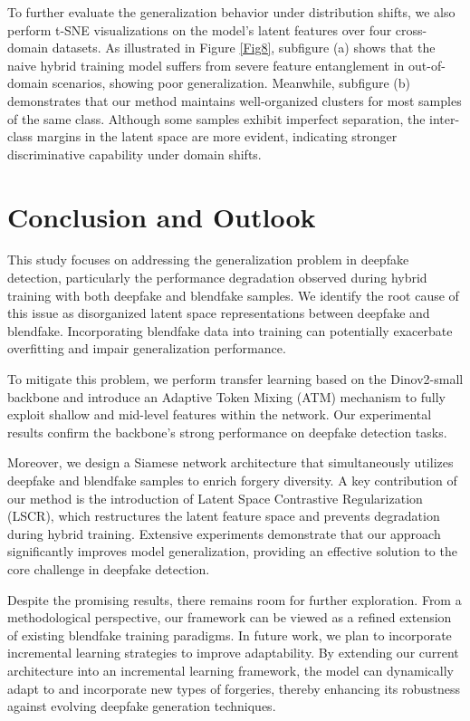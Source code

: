 \documentclass[final,5p,times]{elsarticle}
\begin{document}
To further evaluate the generalization behavior under distribution shifts, we also perform t-SNE visualizations on the model's latent features over four cross-domain datasets. As illustrated in Figure \ref{Fig8}, subfigure (a) shows that the naive hybrid training model suffers from severe feature entanglement in out-of-domain scenarios, showing poor generalization. Meanwhile, subfigure (b) demonstrates that our method maintains well-organized clusters for most samples of the same class. Although some samples exhibit imperfect separation, the inter-class margins in the latent space are more evident, indicating stronger discriminative capability under domain shifts.

\section{Conclusion and Outlook} \label{co}

This study focuses on addressing the generalization problem in deepfake detection, particularly the performance degradation observed during hybrid training with both deepfake and blendfake samples. We identify the root cause of this issue as disorganized latent space representations between deepfake and blendfake. Incorporating blendfake data into training can potentially exacerbate overfitting and impair generalization performance.

To mitigate this problem, we perform transfer learning based on the Dinov2-small backbone and introduce an Adaptive Token Mixing (ATM) mechanism to fully exploit shallow and mid-level features within the network. Our experimental results confirm the backbone's strong performance on deepfake detection tasks.

Moreover, we design a Siamese network architecture that simultaneously utilizes deepfake and blendfake samples to enrich forgery diversity. A key contribution of our method is the introduction of Latent Space Contrastive Regularization (LSCR), which restructures the latent feature space and prevents degradation during hybrid training. Extensive experiments demonstrate that our approach significantly improves model generalization, providing an effective solution to the core challenge in deepfake detection.

Despite the promising results, there remains room for further exploration. From a methodological perspective, our framework can be viewed as a refined extension of existing blendfake training paradigms. In future work, we plan to incorporate incremental learning strategies to improve adaptability. By extending our current architecture into an incremental learning framework, the model can dynamically adapt to and incorporate new types of forgeries, thereby enhancing its robustness against evolving deepfake generation techniques.
\end{document}
